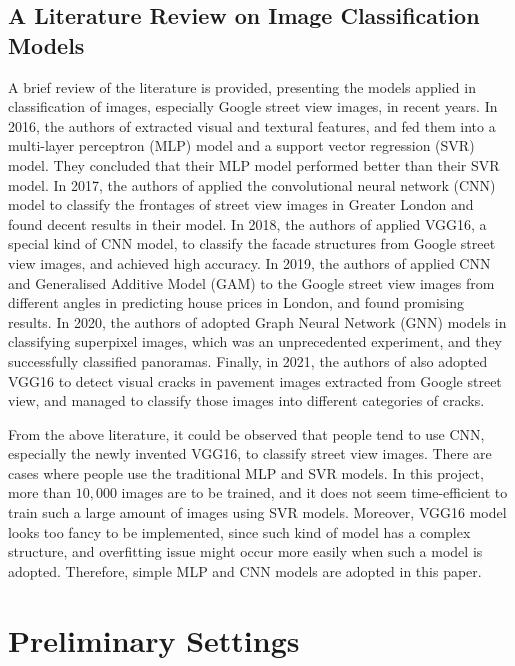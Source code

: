 \documentclass[11pt,twoside]{article}
\numberwithin{Theorem}{section}
\numberwithin{Definition}{section}
\numberwithin{Lemma}{section}
\numberwithin{Algorithm}{section}
\numberwithin{equation}{section}
\begin{document}
\subsection{A Literature Review on Image Classification Models}
A brief review of the literature is provided, presenting the models applied in classification of images, especially Google street view images, in recent years. In 2016, the authors of \cite{ahmed2016house} extracted visual and textural features, and fed them into a multi-layer perceptron (MLP) model and a support vector regression (SVR) model. They concluded that their MLP model performed better than their SVR model. In 2017, the authors of \cite{law2017application} applied the convolutional neural network (CNN) model to classify the frontages of street view images in Greater London and found decent results in their model. In 2018, the authors of \cite{kang2018building} applied VGG16, a special kind of CNN model, to classify the facade structures from Google street view images, and achieved high accuracy. In 2019, the authors of \cite{law2019take} applied CNN and Generalised Additive Model (GAM) to the Google street view images from different angles in predicting house prices in London, and found promising results. In 2020, the authors of \cite{avelar2020superpixel} adopted Graph Neural Network (GNN) models in classifying superpixel images, which was an unprecedented experiment, and they successfully classified panoramas. Finally, in 2021, the authors of \cite{maniat2021deep} also adopted VGG16 to detect visual cracks in pavement images extracted from Google street view, and managed to classify those images into different categories of cracks.

From the above literature, it could be observed that people tend to use CNN, especially the newly invented VGG16, to classify street view images. There are cases where people use the traditional MLP and SVR models. In this project, more than $10,000$ images are to be trained, and it does not seem time-efficient to train such a large amount of images using SVR models. Moreover, VGG16 model looks too fancy to be implemented, since such kind of model has a complex structure, and overfitting issue might occur more easily when such a model is adopted. Therefore, simple MLP and CNN models are adopted in this paper.

\section{Preliminary Settings}
\label{sec:prelim}
\end{document}
